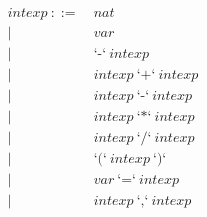 \documentclass[11pt]{article}
\begin{document}
\begin{align*}
    intexp\ ::=\ & nat \\
            |\ \ & var \\
            |\ \ & \textbf{`-`}\ intexp \\
            |\ \ & intexp\ \textbf{`+`}\ intexp \\ 
            |\ \ & intexp\ \textbf{`-`}\ intexp \\ 
            |\ \ & intexp\ \textbf{`*`}\ intexp \\ 
            |\ \ & intexp\ \textbf{`/`}\ intexp \\ 
            |\ \ & \textbf{`(`}\ intexp\ \textbf{`)`} \\
            |\ \ & var\ \textbf{`=`}\ intexp \\
            |\ \ & intexp\ \textbf{`,`}\ intexp
\end{align*}
\end{document}
